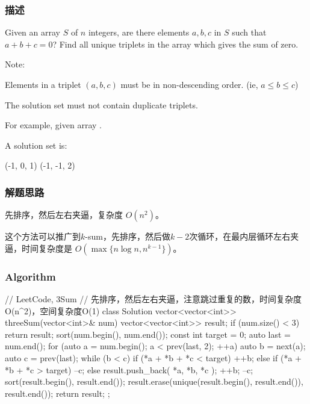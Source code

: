 \subsubsection{描述}
Given an array $S$ of $n$ integers, are there elements $a, b, c$ in $S$ such 
that $a + b + c = 0$? Find all unique triplets in the array which gives the sum 
of zero.

Note:
\begindot
\item Elements in a triplet $(a,b,c)$ must be in non-descending order. (ie, $a 
\leq b \leq c$)
\item The solution set must not contain duplicate triplets.
\myenddot

For example, given array .

A solution set is:
\begin{Code}
	(-1, 0, 1)
	(-1, -1, 2)
\end{Code}


\subsubsection{解题思路}
先排序，然后左右夹逼，复杂度 $O(n^2)$。

这个方法可以推广到$k$-sum，先排序，然后做$k-2$次循环，在最内层循环左右夹逼，时间复杂度是 
$O(\max\{n \log n, n^{k-1}\})$。


\subsubsection{Algorithm}
\begin{Code}
	// LeetCode, 3Sum
	// 先排序，然后左右夹逼，注意跳过重复的数，时间复杂度O(n^2)，空间复杂度O(1)
	class Solution {
		vector<vector<int>> threeSum(vector<int>& num) {
			vector<vector<int>> result;
			if (num.size() < 3) return result;
			sort(num.begin(), num.end());
			const int target = 0;
			auto last = num.end();
			for (auto a = num.begin(); a < prev(last, 2); ++a) {
				auto b = next(a);
				auto c = prev(last);
				while (b < c) {
					if (*a + *b + *c < target) {
						++b;
					} else if (*a + *b + *c > target) {
						--c;
					} else {
						result.push_back({ *a, *b, *c });
						++b;
						--c;
					}
				}
			}
			sort(result.begin(), result.end());
			result.erase(unique(result.begin(), result.end()), result.end());
			return result;
		}
	};
\end{Code}

